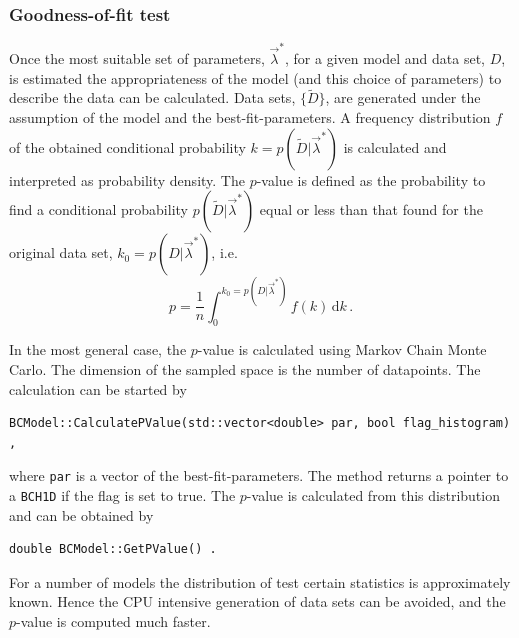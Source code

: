 \documentclass[11pt, a4paper]{article}
\begin{document}

\subsubsection{Goodness-of-fit test}

Once the most suitable set of parameters, $\vec{\lambda}^{*}$, for a
given model and data set, $D$, is estimated the appropriateness of the
model (and this choice of parameters) to describe the data can be
calculated. Data sets, $\{ \tilde{D} \}$, are generated under the
assumption of the model and the best-fit-parameters. A frequency
distribution $f$ of the obtained conditional probability
$k=p(\tilde{D}|\vec{\lambda}^{*})$ is calculated and interpreted as
probability density. The $p$-value is defined as the probability to
find a conditional probability $p(\tilde{D}|\vec{\lambda}^{*})$ equal
or less than that found for the original data set,
$k_{0}=p(D|\vec{\lambda}^{*})$, i.e.
%
\begin{equation}
p = \frac{1}{n} \int_{0}^{k_{0}=p(D|\vec{\lambda}^{*})} f(k) \, \mathrm{d}k \, .
\end{equation}

\noindent
In the most general case, the $p$-value is calculated using Markov
Chain Monte Carlo. The dimension of the sampled space is the number
of datapoints. 
 The calculation can be started by
%
\begin{verbatim}
BCModel::CalculatePValue(std::vector<double> par, bool flag_histogram) ,
\end{verbatim}
%
\noindent
where \verb|par| is a vector of the best-fit-parameters. The method
returns a pointer to a \verb|BCH1D| if the flag is set to true. The
$p$-value is calculated from this distribution and can be obtained by
%
\begin{verbatim}
double BCModel::GetPValue() .
\end{verbatim}

\noindent
For a number of models the distribution of test certain statistics is
approximately known. Hence the CPU intensive generation of data sets
can be avoided, and the $p$-value is computed much faster. \\
\end{document}
